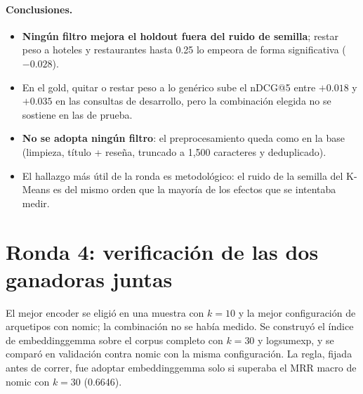\documentclass[11pt,a4paper]{article}
\newcommand{\tabla}[1]{\resizebox{\ifdim\width>\linewidth\linewidth\else\width\fi}{!}{}}
\begin{document}
\begin{table}[H]\centering\small
\tabla{calidad_prueba}
\caption{Combinación de las dos mejores ideas (nombres enmascarados y al menos 8 palabras de
contenido) contra su referencia, en los conjuntos de prueba.}
\end{table}

\paragraph{Conclusiones.}
\begin{itemize}
  \item \textbf{Ningún filtro mejora el holdout fuera del ruido de semilla}; restar peso a hoteles
        y restaurantes hasta 0.25 lo empeora de forma significativa ($-0.028$).
  \item En el gold, quitar o restar peso a lo genérico sube el nDCG@5 entre $+0.018$ y $+0.035$ en
        las consultas de desarrollo, pero la combinación elegida no se sostiene en las de prueba.
  \item \textbf{No se adopta ningún filtro}: el preprocesamiento queda como en la base (limpieza,
        título + reseña, truncado a 1,500 caracteres y deduplicado).
  \item El hallazgo más útil de la ronda es metodológico: el ruido de la semilla del K-Means es del
        mismo orden que la mayoría de los efectos que se intentaba medir.
\end{itemize}

\section{Ronda 4: verificación de las dos ganadoras juntas}

El mejor encoder se eligió en una muestra con $k=10$ y la mejor configuración de arquetipos con
nomic; la combinación no se había medido. Se construyó el índice de embeddinggemma sobre el corpus
completo con $k=30$ y logsumexp, y se comparó en validación contra nomic con la misma
configuración. La regla, fijada antes de correr, fue adoptar embeddinggemma solo si superaba el
MRR macro de nomic con $k=30$ (0.6646).

\begin{table}[H]\centering\small
\tabla{verificacion}
\caption{Validación sobre el corpus completo (187,080 reseñas de entrenamiento). En negritas, la
configuración adoptada.}
\end{table}
\end{document}

